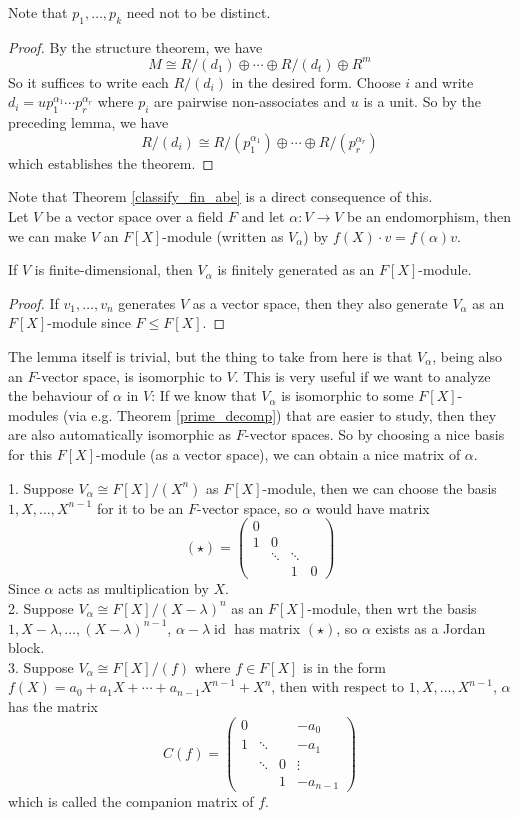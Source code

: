 Note that $p_1,\ldots,p_k$ need not to be distinct.
\begin{proof}
    By the structure theorem, we have
    $$M\cong R/(d_1)\oplus\cdots\oplus R/(d_t)\oplus R^m$$
    So it suffices to write each $R/(d_i)$ in the desired form.
    Choose $i$ and write $d_i=up_1^{\alpha_1}\cdots p_r^{\alpha_r}$ where $p_i$ are pairwise non-associates and $u$ is a unit.
    So by the preceding lemma, we have
    $$R/(d_i)\cong R/(p_1^{\alpha_1})\oplus\cdots\oplus R/(p_r^{\alpha_r})$$
    which establishes the theorem.
\end{proof}
Note that Theorem \ref{classify_fin_abe} is a direct consequence of this.\\
Let $V$ be a vector space over a field $F$ and let $\alpha:V\to V$ be an endomorphism, then we can make $V$ an $F[X]$-module (written as $V_\alpha$) by $f(X)\cdot v=f(\alpha)v$.
\begin{lemma}
    If $V$ is finite-dimensional, then $V_\alpha$ is finitely generated as an $F[X]$-module.
\end{lemma}
\begin{proof}
    If $v_1,\ldots,v_n$ generates $V$ as a vector space, then they also generate $V_\alpha$ as an $F[X]$-module since $F\le F[X]$.
\end{proof}
The lemma itself is trivial, but the thing to take from here is that $V_\alpha$, being also an $F$-vector space, is isomorphic to $V$.
This is very useful if we want to analyze the behaviour of $\alpha$ in $V$:
If we know that $V_\alpha$ is isomorphic to some $F[X]$-modules (via e.g. Theorem \ref{prime_decomp}) that are easier to study, then they are also automatically isomorphic as $F$-vector spaces.
So by choosing a nice basis for this $F[X]$-module (as a vector space), we can obtain a nice matrix of $\alpha$.
\begin{example}
    1. Suppose $V_\alpha\cong F[X]/(X^n)$ as $F[X]$-module, then we can choose the basis $1,X,\ldots,X^{n-1}$ for it to be an $F$-vector space, so $\alpha$ would have matrix
    $$(\star)=\begin{pmatrix}
        0&&&\\
        1&0&&\\
        &\ddots&\ddots&\\
        &&1&0
    \end{pmatrix}$$
    Since $\alpha$ acts as multiplication by $X$.\\
    2. Suppose $V_\alpha\cong F[X]/(X-\lambda)^n$ as an $F[X]$-module, then wrt the basis $1,X-\lambda,\ldots,(X-\lambda)^{n-1}$, $\alpha-\lambda\operatorname{id}$ has matrix $(\star)$, so $\alpha$ exists as a Jordan block.\\
    3. Suppose $V_\alpha\cong F[X]/(f)$ where $f\in F[X]$ is in the form $f(X)=a_0+a_1X+\cdots +a_{n-1}X^{n-1}+X^n$, then with respect to $1,X,\ldots,X^{n-1}$, $\alpha$ has the matrix
    $$C(f)=\begin{pmatrix}
        0&&&-a_0\\
        1&\ddots&&-a_1\\
        &\ddots&0&\vdots\\
        &&1&-a_{n-1}
    \end{pmatrix}$$
    which is called the companion matrix of $f$.
\end{example}
